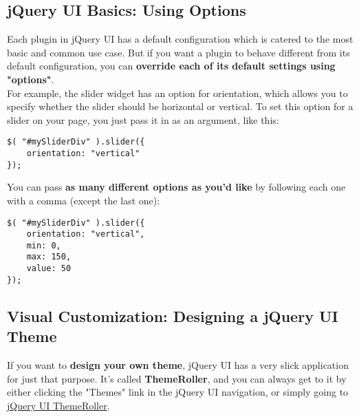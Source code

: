\documentclass[10pt,letterpaper]{report}
\begin{document}
\subsection{jQuery UI Basics: Using Options}
Each plugin in jQuery UI has a default configuration which is catered to the most basic and common use case. But if you want a plugin to behave different from its default configuration, you can \textbf{override each of its default settings using "options"}.\\
For example, the slider widget has an option for orientation, which allows you to specify whether the slider should be horizontal or vertical. To set this option for a slider on your page, you just pass it in as an argument, like this:
\begin{lstlisting}
$( "#mySliderDiv" ).slider({
	orientation: "vertical"
});
\end{lstlisting}
You can pass \textbf{as many different options as you'd like} by following each one with a comma (except the last one):
\begin{lstlisting}
$( "#mySliderDiv" ).slider({
	orientation: "vertical",
	min: 0,
	max: 150,
	value: 50
});
\end{lstlisting}
\subsection{Visual Customization: Designing a jQuery UI Theme}
If you want to \textbf{design your own theme}, jQuery UI has a very slick application for just that purpose. It's called \textbf{ThemeRoller}, and you can always get to it by either clicking the "Themes" link in the jQuery UI navigation, or simply going to \href{http://jqueryui.com/themeroller/}{jQuery UI ThemeRoller}.
\end{document}
